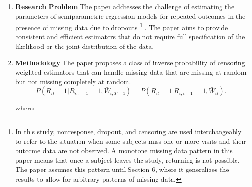 \documentclass[UTF8,a4paper,10pt]{article}
\begin{document}
\begin{enumerate}
    \item \textbf{Research Problem}
    The paper addresses the challenge of estimating the parameters of semiparametric regression models for repeated outcomes in the presence of missing data due to dropouts
    \footnote{In this study, nonresponse, dropout, and censoring are used interchangeably to refer to the situation when some subjects miss one or more visits and their outcome data are not observed. A monotone missing data pattern in this paper means that once a subject leaves the study, returning is not possible. The paper assumes this pattern until Section 6, where it generalizes the results to allow for arbitrary patterns of missing data.}
    . The paper aims to provide consistent and efficient estimators that do not require full specification of the likelihood or the joint distribution of the data.
    \item     \textbf{Methodology}
    The paper proposes a class of inverse probability of censoring weighted estimators that can handle missing data that are missing at random but not missing completely at random.
    \begin{equation*}
        P(R_{it} = 1 | R_{i,t-1} = 1, \bar{W}_{i,T+1}) = P(R_{it} = 1 | R_{i,t-1} = 1, \bar{W}_{it}),
        \end{equation*}
        
        where:
        

\end{enumerate}
\end{document}
